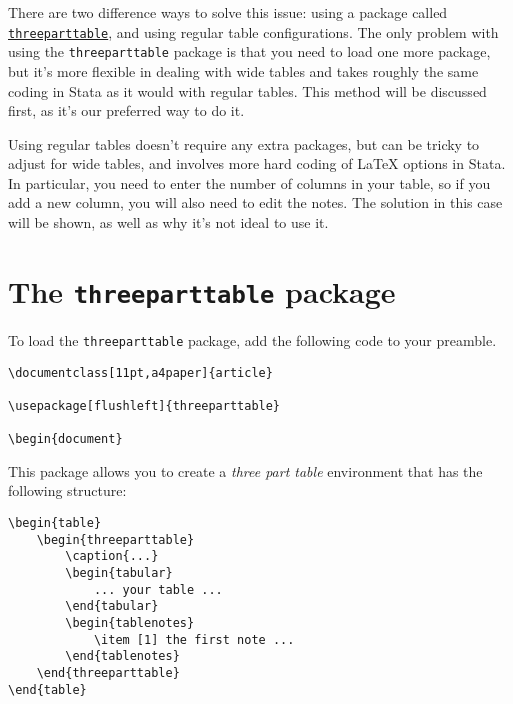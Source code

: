 \documentclass[11pt,a4paper]{article}
\begin{document}
There are two difference ways to solve this issue: using a package called \href{http://mirrors.rit.edu/CTAN/macros/latex/contrib/threeparttable/threeparttable.pdf}{\texttt{threeparttable}}, and using regular table configurations. The only problem with using the \texttt{threeparttable} package is that you need to load one more package, but it's more flexible in dealing with wide tables and takes roughly the same coding in Stata as it would with regular tables. This method will be discussed first, as it's our preferred way to do it.

Using regular tables doesn't require any extra packages, but can be tricky to adjust for wide tables, and involves more hard coding of {\LaTeX} options in Stata. In particular, you need to enter the number of columns in your table, so if you add a new column, you will also need to edit the notes. The solution in this case will be shown, as well as why it's not ideal to use it.

\section{The \texttt{threeparttable} package}

To load the \texttt{threeparttable} package, add the following code to your preamble.

\begin{verbatim}
\documentclass[11pt,a4paper]{article}

\usepackage[flushleft]{threeparttable}

\begin{document}
\end{verbatim}

This package allows you to create a \textit{three part table} environment that has the following structure:

\begin{samepage}
\begin{verbatim}
\begin{table}
    \begin{threeparttable}
        \caption{...}
        \begin{tabular}
            ... your table ...
        \end{tabular}
        \begin{tablenotes}
            \item [1] the first note ...
        \end{tablenotes}
    \end{threeparttable}
\end{table}

\end{verbatim}
\end{samepage}
\end{document}
